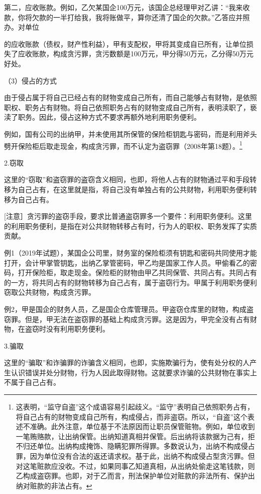 第二，应收账款。例如，乙欠某国企100万元，该国企总经理甲对乙讲：“我来收款，你将欠款的一半打给我，我将账做平，算你还清了国企的欠款。”乙答应并照办。对单位

的应收账款（债权，财产性利益），甲有支配权，甲将其变成自已所有，让单位损失了应收账款，构成贪污罪，贪污数额是100万元，甲分得50万元，乙分得50万元好处。

（3）侵占的方式

由于侵占属于将自己已经占有的财物变成自己所有，而自己能够占有财物，是依照职权、职务占有财物。将自己依照职务占有的财物变成自己所有，表明渎职了，亵渎了职务。因此，侵占这种方式不要求再额外地利用职务便利。

例如，国有公司的出纳甲，并未使用其所保管的保险柜钥匙与密码，而是利用斧头劈开保险柜后取走现金，构成贪污罪，而不认定为盗窃罪（2008年第18题）。\footnote{这表明，“监守自盗”这个成语容易引起歧义。“监守”表明自己依照职务占有，将自己占有的财物变成自己所有，构成侵占，而非盗窃。所以，“自盗”这个表述不准确。此外注意，单位基于不法原因而让职员保管赃物。例如，单位收到一笔贿赂款，让出纳保管。出纳知道真相并保管。后出纳将该款据为己有，拒不归还单位。出纳构成掩饰、隐瞒犯罪所得罪。多数说认为，出纳不构成侵占罪，因为单位没有合法的返还请求权。基于此，出纳不构成侵占型贪污罪。但对这笔赃款应没收。不过，如果同事乙知道真相，从出纳处偷走这笔钱款，则乙构成盗窃罪。也即，对于乙而言，刑法保护单位对赃款的非法所有、保护出纳对赃款的非法占有。}

2.窃取

这里的“窃取”和盗窃罪的盗窃含义相同，也即，将他人占有的财物通过平和手段转移为自己占有，在这里就是指，将自己没有单独占有的公共财物，利用职务便利转移为自己占有。

[注意］贪污罪的盗窃手段，要求比普通盗窃罪多一个要件：利用职务便利。这里的利用职务便利，是指在对公共财物转移占有时，行为人的职权、职务发挥了实质贡献。

例1（2019年试题），某国企公司里，财务室的保险柜须有钥匙和密码共同使用才能打开，会计甲掌管钥匙，出纳乙掌管密码，甲乙均是国家工作人员。甲偷看乙的密码，打开保险柜，取走现金。保险柜的财物由甲乙共同保管、共同占有。共同占有的一方，将共同占有的财物转移为自己占有，属于盗窃行为。甲属于利用职务便利窃取公共财物，构成贪污罪。

例2，甲是国企的财务人员，乙是国企仓库管理员。甲盗窃仓库里的财物，构成盗窃罪。但是，甲无法在盗窃罪的基础上构成贪污罪。这是因为，甲完全没有占有财物，在盗窃时没有利用职务便利。

3.骗取

这里的“骗取”和诈骗罪的诈骗含义相同，也即，实施欺骗行为，使有处分权的人产生认识错误并处分财物，行为人因此取得财物。这就要求诈骗的公共财物在事实上不属于自己占有。

